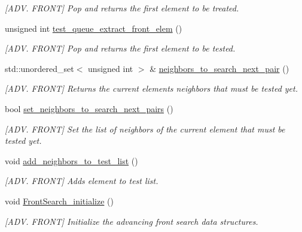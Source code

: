 \begin{DoxyCompactItemize}
\begin{DoxyCompactList}\small\item\em \mbox{[}A\+D\+V. F\+R\+O\+N\+T\mbox{]} Pop and returns the first element to be treated. \end{DoxyCompactList}\item 
unsigned int \hyperlink{classcarl_1_1_patch__construction_acd5103493a58956176ee623c6e6787b5}{test\+\_\+queue\+\_\+extract\+\_\+front\+\_\+elem} ()
\begin{DoxyCompactList}\small\item\em \mbox{[}A\+D\+V. F\+R\+O\+N\+T\mbox{]} Pop and returns the first element to be tested. \end{DoxyCompactList}\item 
std\+::unordered\+\_\+set$<$ unsigned int $>$ \& \hyperlink{classcarl_1_1_patch__construction_a053beda8441a91cbb12ffab38b38e524}{neighbors\+\_\+to\+\_\+search\+\_\+next\+\_\+pair} ()
\begin{DoxyCompactList}\small\item\em \mbox{[}A\+D\+V. F\+R\+O\+N\+T\mbox{]} Returns the current element\textquotesingle{}s neighbors that must be tested yet. \end{DoxyCompactList}\item 
bool \hyperlink{classcarl_1_1_patch__construction_aae1b3eb6c7e186b9aaf12331c3460a38}{set\+\_\+neighbors\+\_\+to\+\_\+search\+\_\+next\+\_\+pairs} ()
\begin{DoxyCompactList}\small\item\em \mbox{[}A\+D\+V. F\+R\+O\+N\+T\mbox{]} Set the list of neighbors of the current element that must be tested yet. \end{DoxyCompactList}\item 
void \hyperlink{classcarl_1_1_patch__construction_a142bb087f4642c416c5ec813efa764a3}{add\+\_\+neighbors\+\_\+to\+\_\+test\+\_\+list} ()
\begin{DoxyCompactList}\small\item\em \mbox{[}A\+D\+V. F\+R\+O\+N\+T\mbox{]} Adds element to test list. \end{DoxyCompactList}\item 
void \hyperlink{classcarl_1_1_patch__construction_a6e30c4e833f5ea13f8db59b71b0257ad}{Front\+Search\+\_\+initialize} ()
\begin{DoxyCompactList}\small\item\em \mbox{[}A\+D\+V. F\+R\+O\+N\+T\mbox{]} Initialize the advancing front search data structures. \end{DoxyCompactList}\item 

\end{DoxyCompactItemize}
